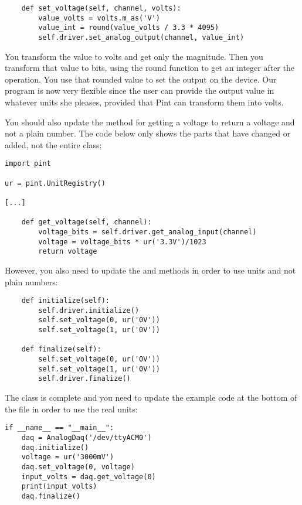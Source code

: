 \begin{verbatim}
    def set_voltage(self, channel, volts):
        value_volts = volts.m_as('V')
        value_int = round(value_volts / 3.3 * 4095)
        self.driver.set_analog_output(channel, value_int)
\end{verbatim}

You transform the value to volts and get only the magnitude. Then you transform that value to bits, using the round function to get an integer after the operation. You use that rounded value to set the output on the device. Our program is now very flexible since the user can provide the output value in whatever units she pleases, provided that Pint can transform them into volts.


You should also update the method for getting a voltage to return a voltage and not a plain number. The code below only shows the parts that have changed or added, not the entire class:

\begin{verbatim}
import pint

ur = pint.UnitRegistry()

[...]

    def get_voltage(self, channel):
        voltage_bits = self.driver.get_analog_input(channel)
        voltage = voltage_bits * ur('3.3V')/1023
        return voltage
\end{verbatim}

However, you also need to update the  and  methods in order to use units and not plain numbers:

\begin{verbatim}
    def initialize(self):
        self.driver.initialize()
        self.set_voltage(0, ur('0V'))
        self.set_voltage(1, ur('0V'))

    def finalize(self):
        self.set_voltage(0, ur('0V'))
        self.set_voltage(1, ur('0V'))
        self.driver.finalize()
\end{verbatim}

The class is complete and you need to update the example code at the bottom of the file in order to use the real units:

\begin{verbatim}
if __name__ == "__main__":
    daq = AnalogDaq('/dev/ttyACM0')
    daq.initialize()
    voltage = ur('3000mV')
    daq.set_voltage(0, voltage)
    input_volts = daq.get_voltage(0)
    print(input_volts)
    daq.finalize()
\end{verbatim}


